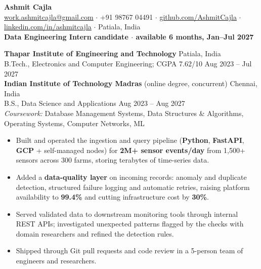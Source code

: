 
\renewcommand{\contact}{%
\begin{center}
{\Huge\textbf{Ashmit Cajla}}\\[3pt]
\href{mailto:work.ashmitcajla@gmail.com}{work.ashmitcajla@gmail.com} $\cdot$ +91 98767 04491 $\cdot$
\href{https://github.com/AshmitCajla}{github.com/AshmitCajla} $\cdot$
\href{https://www.linkedin.com/in/ashmitcajla/}{linkedin.com/in/ashmitcajla} $\cdot$ Patiala, India\\[2pt]
\small\textbf{Data Engineering Intern candidate $\cdot$ available 6 months, Jan--Jul 2027}
\end{center}\vspace{-6pt}}

\contact

\textbf{Thapar Institute of Engineering and Technology} \hfill Patiala, India\\
B.Tech., Electronics and Computer Engineering; CGPA 7.62/10 \hfill Aug 2023 -- Jul 2027\\[2pt]
\textbf{Indian Institute of Technology Madras} (online degree, concurrent) \hfill Chennai, India\\
B.S., Data Science and Applications \hfill Aug 2023 -- Aug 2027\\
\textit{Coursework:} Database Management Systems, Data Structures \& Algorithms, Operating Systems, Computer Networks, ML

\begin{itemize}
  \item Built and operated the ingestion and query pipeline (\textbf{Python}, \textbf{FastAPI}, \textbf{GCP} + self-managed nodes) for \textbf{2M+ sensor events/day} from 1,500+ sensors across 300 farms, storing terabytes of time-series data.
  \item Added a \textbf{data-quality layer} on incoming records: anomaly and duplicate detection, structured failure logging and automatic retries, raising platform availability to \textbf{99.4\%} and cutting infrastructure cost by \textbf{30\%}.
  \item Served validated data to downstream monitoring tools through internal REST APIs; investigated unexpected patterns flagged by the checks with domain researchers and refined the detection rules.
  \item Shipped through Git pull requests and code review in a 5-person team of engineers and researchers.
\end{itemize}

